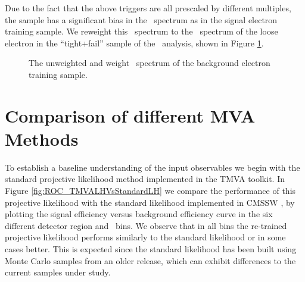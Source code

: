 \documentclass{cmspaper}
\begin{document}
Due to the fact that the above triggers are all prescaled by different multiples, the sample has a significant bias in the \pt\ spectrum as in the signal electron training sample. We reweight this \pt\ spectrum to the \pt\ spectrum of the loose electron in the ``tight+fail'' sample of the \hww\ analysis\cite{hww_eps}, shown in Figure \ref{fig:BkgPtSpectrum}.

\begin{figure}[!htbp]
\begin{center}
\caption{The unweighted and weight \pt\ spectrum of the background electron training sample.}
\label{fig:BkgPtSpectrum}
\end{center}
\end{figure}

\section{Comparison of different MVA Methods}

To establish a baseline understanding of the input observables we begin with the standard projective likelihood method implemented in the TMVA toolkit. In Figure \ref{fig:ROC_TMVALHVsStandardLH} we compare the performance of this projective likelihood with the standard likelihood implemented in CMSSW \cite{EleLikelihood}, by plotting the signal efficiency versus background efficiency curve in the six different detector region and \pt\ bins. We observe that in all bins the re-trained projective likelihood performs similarly to the standard likelihood or in some cases better. This is expected since the standard likelihood has been built using Monte Carlo samples from an older release, which can exhibit differences to the current samples under study. 
\end{document}
